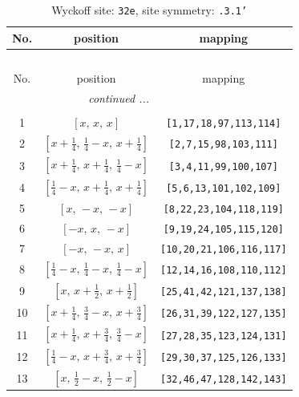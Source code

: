 \documentclass[fleqn,8pt]{jsarticle}
\begin{document}
\begin{longtable}{ccc}
\caption{Wyckoff site: {\tt 32e}, site symmetry: {\tt .3.1'}}
 \\
 \hline \hline
No. & position & mapping \\ \hline \endfirsthead

\multicolumn{2}{l}{\tablename\ \thetable{}} \\
 \hline \hline
No. & position & mapping \\ \hline \endhead

 \hline \hline
\multicolumn{2}{r}{\footnotesize\it continued ...} \\ \endfoot

 \hline \hline
\multicolumn{2}{r}{} \\ \endlastfoot

1 & $\left[ x,\, x,\, x \right]$ & {\tt [1,17,18,97,113,114]} \\ \hline
2 & $\left[ x + \frac{1}{4},\, \frac{1}{4} - x,\, x + \frac{1}{4} \right]$ & {\tt [2,7,15,98,103,111]} \\ \hline
3 & $\left[ x + \frac{1}{4},\, x + \frac{1}{4},\, \frac{1}{4} - x \right]$ & {\tt [3,4,11,99,100,107]} \\ \hline
4 & $\left[ \frac{1}{4} - x,\, x + \frac{1}{4},\, x + \frac{1}{4} \right]$ & {\tt [5,6,13,101,102,109]} \\ \hline
5 & $\left[ x,\, - x,\, - x \right]$ & {\tt [8,22,23,104,118,119]} \\ \hline
6 & $\left[ - x,\, x,\, - x \right]$ & {\tt [9,19,24,105,115,120]} \\ \hline
7 & $\left[ - x,\, - x,\, x \right]$ & {\tt [10,20,21,106,116,117]} \\ \hline
8 & $\left[ \frac{1}{4} - x,\, \frac{1}{4} - x,\, \frac{1}{4} - x \right]$ & {\tt [12,14,16,108,110,112]} \\ \hline
9 & $\left[ x,\, x + \frac{1}{2},\, x + \frac{1}{2} \right]$ & {\tt [25,41,42,121,137,138]} \\ \hline
10 & $\left[ x + \frac{1}{4},\, \frac{3}{4} - x,\, x + \frac{3}{4} \right]$ & {\tt [26,31,39,122,127,135]} \\ \hline
11 & $\left[ x + \frac{1}{4},\, x + \frac{3}{4},\, \frac{3}{4} - x \right]$ & {\tt [27,28,35,123,124,131]} \\ \hline
12 & $\left[ \frac{1}{4} - x,\, x + \frac{3}{4},\, x + \frac{3}{4} \right]$ & {\tt [29,30,37,125,126,133]} \\ \hline
13 & $\left[ x,\, \frac{1}{2} - x,\, \frac{1}{2} - x \right]$ & {\tt [32,46,47,128,142,143]} \\ \hline

\end{longtable}
\end{document}
